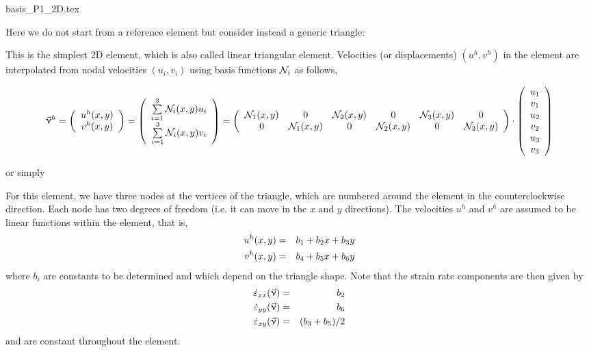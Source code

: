 \begin{flushright} {\tiny {\color{gray} basis\_P1\_2D.tex}} \end{flushright}

Here we do not start from a reference element but consider instead a generic triangle:



This is the simplest 2D element, which is also called linear triangular element.
Velocities (or displacements) $(u^h,v^h)$ in the element are interpolated from nodal velocities
$(u_i,v_i)$ using basis functions ${\mathcal{N}}_i$ as follows,
\begin{small}
\[
\vec\upnu^h=
\left(
\begin{array}{c}
u^h(x,y) \\v^h(x,y)
\end{array}
\right)
=
\left(
\begin{array}{c}
\sum\limits_{i=1}^3 {\mathcal{N}}_i(x,y) u_i \\
\sum\limits_{i=1}^3 {\mathcal{N}}_i(x,y) v_i
\end{array}
\right)
=
\left(
\begin{array}{cccccc}
{\mathcal{N}}_1(x,y) & 0 & {\mathcal{N}}_2(x,y) & 0 & {\mathcal{N}}_3(x,y) & 0\\
0 & {\mathcal{N}}_1(x,y) & 0 & {\mathcal{N}}_2(x,y) & 0 & {\mathcal{N}}_3(x,y)\\
\end{array}
\right)
\cdot
\left(
\begin{array}{c}
u_1 \\ v_1 \\ u_2 \\ v_2 \\ u_3 \\ v_3
\end{array}
\right)
\]
\end{small}
or simply 

For this element, we have three nodes at the vertices of the triangle, which are 
numbered around the element in the counterclockwise direction. 
Each node has two degrees of freedom (i.e. it can move in the $x$ and $y$ directions). 
The velocities $u^h$ and $v^h$ are assumed to be linear functions within the element, that is, 
\begin{eqnarray}
u^h(x,y)&=&b_1 +b_2x+b_3y \nonumber\\
v^h(x,y)&=&b_4 +b_5x+b_6y
\end{eqnarray}
where $b_i$ are constants to be determined and which depend on the triangle shape.
Note that the strain rate components are then given by
\begin{eqnarray}
\dot\varepsilon_{xx}(\vec\upnu)&=&b_2  \nonumber\\
\dot\varepsilon_{yy}(\vec\upnu)&=&b_6  \nonumber\\
\dot\varepsilon_{xy}(\vec\upnu)&=&(b_3+b_5)/2 \nonumber
\end{eqnarray}
and are constant throughout the element.

